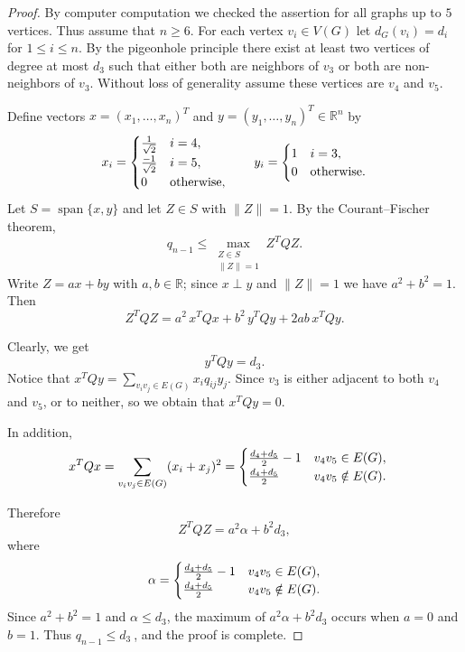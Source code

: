 \documentclass[10pt,a4paper]{amsart}
\begin{document}
\begin{proof}
By computer computation we checked the assertion for all graphs up to $5$ vertices.
Thus assume that $n\ge 6$. For each vertex $v_i\in V(G)$ let $d_G(v_i)=d_i$ for $1\le i\le n$.
By the pigeonhole principle there exist at least two vertices of degree at most $d_3$ such that either both are neighbors of $v_3$ or both are non-neighbors of $v_3$. Without loss of generality assume these vertices are $v_4$ and $v_5$.

\noindent Define vectors $x=(x_1,\dots,x_n)^T$ and $y=(y_1,\dots,y_n)^T\in\mathbb{R}^n$ by
\[
	\begin{aligned}
		x_i=
		\begin{cases}
			{1 \over \sqrt{2}} & i = 4,\\
			{-1 \over \sqrt{2}} & i = 5,\\
			0 & \text{otherwise},
		\end{cases}
		\qquad
		y_i=
		\begin{cases}
			1 & i = 3,\\
			0 & \text{otherwise}.
		\end{cases}
	\end{aligned}
	\]
Let $S=\operatorname{span}\{x,y\}$ and let $Z\in S$ with $\|Z\|=1$.
By the Courant--Fischer theorem,
\[
q_{n-1}\le \max_{\substack{Z\in S\\ \|Z\|=1}} Z^T Q Z.
\]
Write $Z=a x + b y$ with $a,b\in\mathbb{R}$; since $x\perp y$ and $\|Z\|=1$ we have $a^2+b^2=1$.
Then
\[
Z^T Q Z = a^2\, x^T Q x + b^2\, y^T Q y + 2ab\, x^T Q y.
\]

\noindent Clearly, we get
\[
y^T Q y = d_3.
\]
Notice that ${x^T}Qy = \sum\limits_{{v_i}{v_j} \in E(G)} {{x_i}{q_{ij}}{y_j}} $. Since $v_3$ is either adjacent to both $v_4$ and $v_5$, or to neither, so we obtain that ${x^T}Qy = 0.$

\noindent In addition,
\[
	\begin{aligned}
		x^T Q x &=\sum_{v_i v_j\in E(G)} (x_i+x_j)^2=
		\begin{cases}
			{{{{d_4} + {d_5}} \over 2} - 1} & v_4v_5\in E(G),\\
			{{{{d_4} + {d_5}} \over 2}} & v_4v_5\notin E(G).\\
		\end{cases}
	\end{aligned}
\]

\noindent Therefore
\[
Z^T Q Z = a^2 \alpha + b^2 d_3,
\]
where
\[
\alpha =
\begin{cases}
{{{{d_4} + {d_5}} \over 2} - 1} & v_4v_5\in E(G),\\
			{{{{d_4} + {d_5}} \over 2}} & v_4v_5\notin E(G).\\
		
\end{cases}
\]
Since $a^2+b^2=1$ and $\alpha  \le {d_3}$, the maximum of $a^2 \alpha + b^2 d_3$ occurs when $a=0$ and $b=1$.
Thus ${q_{n - 1}} \le {d_3}\ $, and the proof is complete.
\end{proof}
\end{document}
